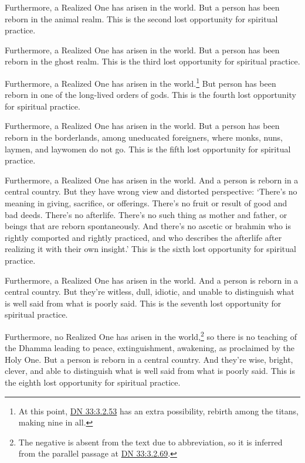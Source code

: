 \documentclass[12pt,openany]{book}%
\begin{document}
Furthermore, a Realized One has arisen in the world. But a person has been reborn in the animal realm. This is the second lost opportunity for spiritual practice. 

Furthermore, a Realized One has arisen in the world. But a person has been reborn in the ghost realm. This is the third lost opportunity for spiritual practice. 

Furthermore, a Realized One has arisen in the world.\footnote{At this point, \href{https://suttacentral.net/dn33/en/sujato\#3.2.53}{DN 33:3.2.53} has an extra possibility, rebirth among the titans, making nine in all. } But person has been reborn in one of the long-lived orders of gods. This is the fourth lost opportunity for spiritual practice. 

Furthermore, a Realized One has arisen in the world. But a person has been reborn in the borderlands, among uneducated foreigners, where monks, nuns, laymen, and laywomen do not go. This is the fifth lost opportunity for spiritual practice. 

Furthermore, a Realized One has arisen in the world. And a person is reborn in a central country. But they have wrong view and distorted perspective: ‘There’s no meaning in giving, sacrifice, or offerings. There’s no fruit or result of good and bad deeds. There’s no afterlife. There’s no such thing as mother and father, or beings that are reborn spontaneously. And there’s no ascetic or brahmin who is rightly comported and rightly practiced, and who describes the afterlife after realizing it with their own insight.’ This is the sixth lost opportunity for spiritual practice. 

Furthermore, a Realized One has arisen in the world. And a person is reborn in a central country. But they’re witless, dull, idiotic, and unable to distinguish what is well said from what is poorly said. This is the seventh lost opportunity for spiritual practice. 

Furthermore, no Realized One has arisen in the world,\footnote{The negative is absent from the text due to abbreviation, so it is inferred from the parallel passage at \href{https://suttacentral.net/dn33/en/sujato\#3.2.69}{DN 33:3.2.69}. } so there is no teaching of the Dhamma leading to peace, extinguishment, awakening, as proclaimed by the Holy One. But a person is reborn in a central country. And they’re wise, bright, clever, and able to distinguish what is well said from what is poorly said. This is the eighth lost opportunity for spiritual practice. 
\end{document}
